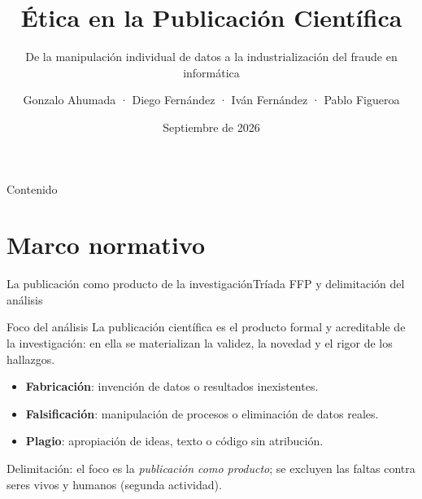 \documentclass[11pt,aspectratio=169,xcolor=table]{beamer}
\title[Ética en la publicación científica]{Ética en la Publicación Científica}
\subtitle{De la manipulación individual de datos a la industrialización del fraude en informática}
\author[G.~Ahumada · D.~Fernández · I.~Fernández · P.~Figueroa]{%
  Gonzalo Ahumada · Diego Fernández · Iván Fernández · Pablo Figueroa}
\date{Septiembre de 2026}
\institute[USACH]{Universidad de Santiago de Chile}
\begin{document}
\usachportada
{}

\begin{frame}{Contenido}
  \tableofcontents
\end{frame}

\section{Marco normativo}

\begin{frame}{La publicación como producto de la investigación}{Tríada FFP y delimitación del análisis}
  \begin{block}{Foco del análisis}
    La publicación científica es el producto formal y acreditable de la
    investigación: en ella se materializan la validez, la novedad y el rigor
    de los hallazgos.
  \end{block}
  \begin{itemize}\usachaire
    \item \textbf{Fabricación}: invención de datos o resultados inexistentes.
    \item \textbf{Falsificación}: manipulación de procesos o eliminación de datos reales.
    \item \textbf{Plagio}: apropiación de ideas, texto o código sin atribución.
  \end{itemize}
  \alert{Delimitación}: el foco es la \emph{publicación como producto}; se
  excluyen las faltas contra seres vivos y humanos (segunda actividad).
\end{frame}
\end{document}
